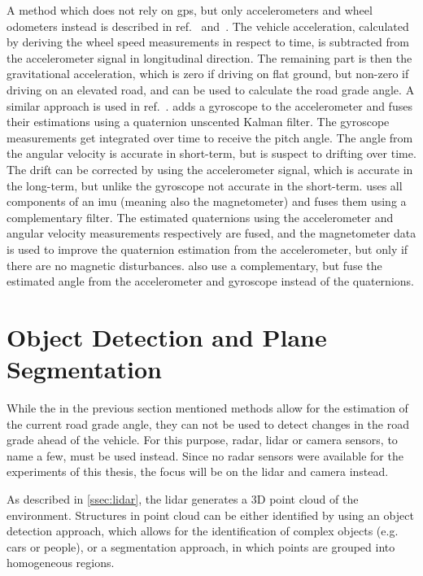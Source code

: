 A method which does not rely on \gls{gps}, but only accelerometers and wheel odometers instead is described in ref.~\cite{Nilsson2012} and~\cite{Palella2016}.
The vehicle acceleration, calculated by deriving the wheel speed measurements in respect to time, is subtracted from the accelerometer signal in longitudinal direction.
The remaining part is then the gravitational acceleration, which is zero if driving on flat ground, but non-zero if driving on an elevated road, and can be used to calculate the road grade angle.
A similar approach is used in ref.~\cite{Sentouh2008}.
\cite{He2020} adds a gyroscope to the accelerometer and fuses their estimations using a quaternion unscented Kalman filter.
The gyroscope measurements get integrated over time to receive the pitch angle.
The angle from the angular velocity is accurate in short-term, but is suspect to drifting over time.
The drift can be corrected by using the accelerometer signal, which is accurate in the long-term, but unlike the gyroscope not accurate in the short-term.
\cite{Wu2016} uses all components of an \gls{imu} (meaning also the magnetometer) and fuses them using a complementary filter.
The estimated quaternions using the accelerometer and angular velocity measurements respectively are fused, and the magnetometer data is used to improve the quaternion estimation from the accelerometer, but only if there are no magnetic disturbances.
\cite{Euston2008,Jauch2018} also use a complementary, but fuse the estimated angle from the accelerometer and gyroscope instead of the quaternions.



\section[Plane segmentation]{Object Detection and Plane Segmentation}
While the in the previous section mentioned methods allow for the estimation of the current road grade angle, they can not be used to detect changes in the road grade ahead of the vehicle.
For this purpose, \gls{radar}, \gls{lidar} or camera sensors, to name a few, must be used instead.
Since no \gls{radar} sensors were available for the experiments of this thesis, the focus will be on the \gls{lidar} and camera instead.

As described in \cref{ssec:lidar}, the \gls{lidar} generates a 3D point cloud of the environment.
Structures in point cloud can be either identified by using an object detection approach, which allows for the identification of complex objects (e.g. cars or people), or a segmentation approach, in which points are grouped into homogeneous regions.

